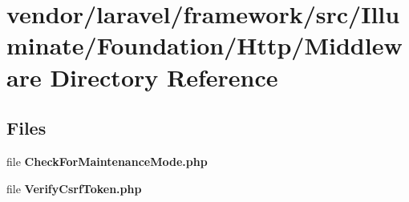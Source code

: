 \section{vendor/laravel/framework/src/\+Illuminate/\+Foundation/\+Http/\+Middleware Directory Reference}
\label{dir_940e1e7251e97b4f9cb1b271edfdfec9}
\subsection*{Files}
\begin{DoxyCompactItemize}
\item 
file {\bf Check\+For\+Maintenance\+Mode.\+php}
\item 
file {\bf Verify\+Csrf\+Token.\+php}
\end{DoxyCompactItemize}
